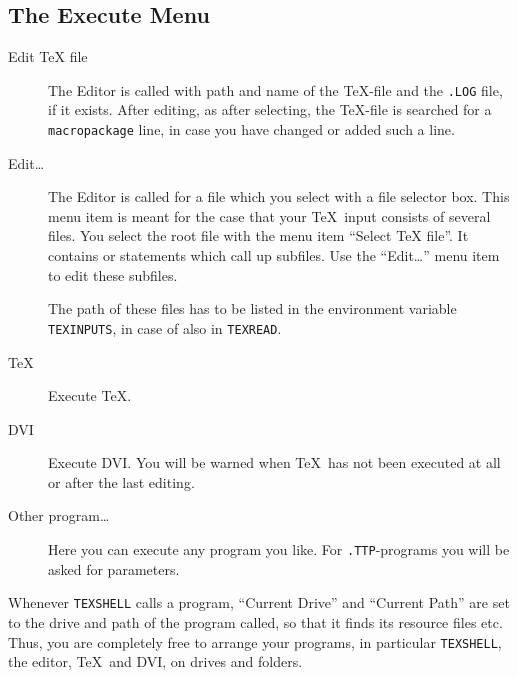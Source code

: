 \subsection*{The Execute Menu}

\begin{description}

\item[Edit TeX file]
The Editor is called with path and name of the \TeX-file
and the {\tt .LOG} file, if it exists.
After editing, as after selecting, the \TeX-file is searched
for a {\tt macro\-package} line,
in case you have changed or added such a line.

\item[Edit\ldots]
The Editor is called for a file which you select
with a file selector box.
This menu item is meant for the case that
your \TeX\ input consists of several files.
You select the root file with the menu item ``Select TeX file''.
It contains \verb|| or \verb|| statements which call up subfiles. 
Use the ``Edit\ldots'' menu item to edit these subfiles.

The path of these files has to be listed in the environment variable 
{\tt TEX\-IN\-PUTS}, in case of \verb|| also in {\tt TEX\-READ}.

\item[TeX]
Execute \TeX.

\item[DVI]
Execute DVI. You will be warned when \TeX\ has not been executed
at all or 
after the last editing.

\item[Other program\ldots]
Here you can execute any program you like.
For {\tt .TTP}-programs you will be asked for parameters.
\end{description}

Whenever {\tt TEX\-SHELL} calls a program, ``Current Drive''
and ``Current Path'' are set to the drive and path of the program called,
so that it finds its resource files etc.
Thus, you are completely free to arrange your programs, in particular
{\tt TEX\-SHELL}, the editor, \TeX\ and DVI, on drives and folders.
 
